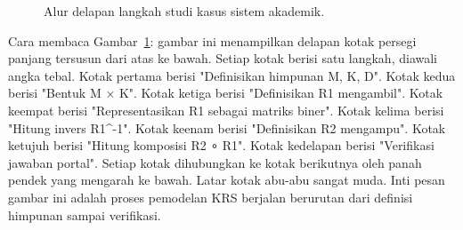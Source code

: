 \documentclass[11pt,a4paper]{article}
\begin{document}
\begin{figure}[H]
	\centering
	\caption{Alur delapan langkah studi kasus sistem akademik.}
	\label{fig:alur-studi-kasus}
\end{figure}

Cara membaca Gambar~\ref{fig:alur-studi-kasus}: gambar ini menampilkan delapan kotak persegi panjang tersusun dari atas ke bawah. Setiap kotak berisi satu langkah, diawali angka tebal. Kotak pertama berisi "Definisikan himpunan M, K, D". Kotak kedua berisi "Bentuk M × K". Kotak ketiga berisi "Definisikan R1 mengambil". Kotak keempat berisi "Representasikan R1 sebagai matriks biner". Kotak kelima berisi "Hitung invers R1^-1". Kotak keenam berisi "Definisikan R2 mengampu". Kotak ketujuh berisi "Hitung komposisi R2 ∘ R1". Kotak kedelapan berisi "Verifikasi jawaban portal". Setiap kotak dihubungkan ke kotak berikutnya oleh panah pendek yang mengarah ke bawah. Latar kotak abu-abu sangat muda. Inti pesan gambar ini adalah proses pemodelan KRS berjalan berurutan dari definisi himpunan sampai verifikasi.
\end{document}
